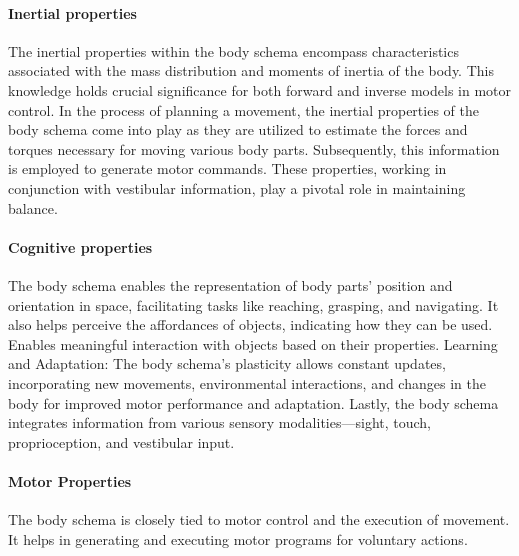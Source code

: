 \paragraph*{Inertial properties} 
The inertial properties within the body schema encompass characteristics associated with the mass distribution and moments of inertia of the body. This knowledge holds crucial significance for both forward and inverse models in motor control. In the process of planning a movement, the inertial properties of the body schema come into play as they are utilized to estimate the forces and torques necessary for moving various body parts. Subsequently, this information is employed to generate motor commands. These properties, working in conjunction with vestibular information, play a pivotal role in maintaining balance.

\paragraph*{Cognitive properties} The body schema enables the representation of body parts' position and orientation in space, facilitating tasks like reaching, grasping, and navigating. It also helps perceive the affordances of objects, indicating how they can be used. Enables meaningful interaction with objects based on their properties. Learning and Adaptation: The body schema's plasticity allows constant updates, incorporating new movements, environmental interactions, and changes in the body for improved motor performance and adaptation. Lastly, the body schema integrates information from various sensory modalities—sight, touch, proprioception, and vestibular input.

\paragraph*{Motor Properties} The body schema is closely tied to motor control and the execution of movement. It helps in generating and executing motor programs for voluntary actions.

